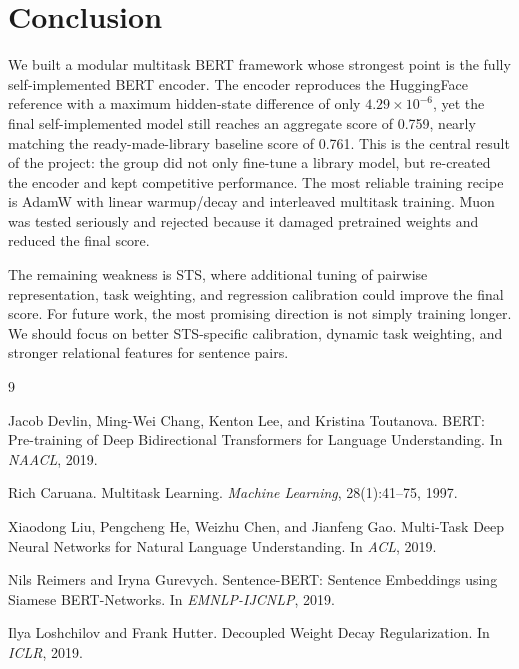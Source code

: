 \documentclass{article}
\begin{document}
\section{Conclusion}

We built a modular multitask BERT framework whose strongest point is the fully self-implemented BERT encoder. The encoder reproduces the HuggingFace reference with a maximum hidden-state difference of only $4.29\times10^{-6}$, yet the final self-implemented model still reaches an aggregate score of 0.759, nearly matching the ready-made-library baseline score of 0.761. This is the central result of the project: the group did not only fine-tune a library model, but re-created the encoder and kept competitive performance. The most reliable training recipe is AdamW with linear warmup/decay and interleaved multitask training. Muon was tested seriously and rejected because it damaged pretrained weights and reduced the final score.

The remaining weakness is STS, where additional tuning of pairwise representation, task weighting, and regression calibration could improve the final score. For future work, the most promising direction is not simply training longer. We should focus on better STS-specific calibration, dynamic task weighting, and stronger relational features for sentence pairs.

\begin{thebibliography}{9}

Jacob Devlin, Ming-Wei Chang, Kenton Lee, and Kristina Toutanova.
\newblock BERT: Pre-training of Deep Bidirectional Transformers for Language Understanding.
\newblock In \emph{NAACL}, 2019.

Rich Caruana.
\newblock Multitask Learning.
\newblock \emph{Machine Learning}, 28(1):41--75, 1997.

Xiaodong Liu, Pengcheng He, Weizhu Chen, and Jianfeng Gao.
\newblock Multi-Task Deep Neural Networks for Natural Language Understanding.
\newblock In \emph{ACL}, 2019.

Nils Reimers and Iryna Gurevych.
\newblock Sentence-BERT: Sentence Embeddings using Siamese BERT-Networks.
\newblock In \emph{EMNLP-IJCNLP}, 2019.

Ilya Loshchilov and Frank Hutter.
\newblock Decoupled Weight Decay Regularization.
\newblock In \emph{ICLR}, 2019.

\end{thebibliography}
\end{document}
